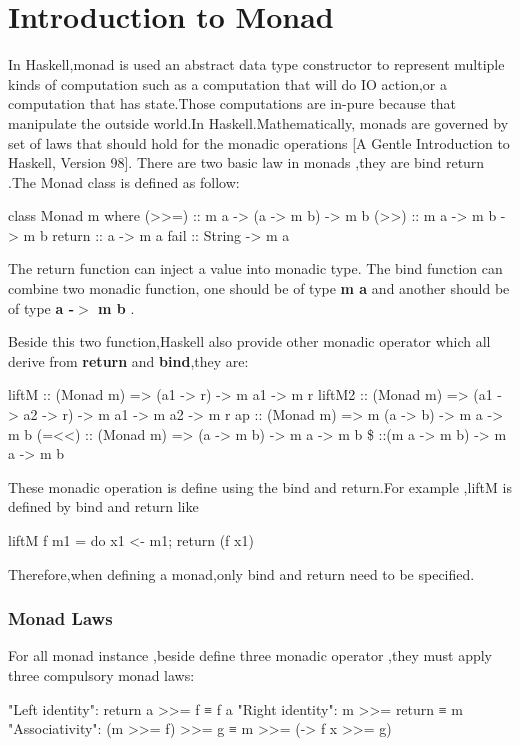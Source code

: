 \section{Introduction to Monad}
In Haskell,monad is used an abstract data type constructor to represent multiple kinds of computation such as a computation that will do IO action,or a computation that has state.Those computations are in-pure because that manipulate the outside world.In Haskell.Mathematically, monads are governed by set of laws that should hold for the monadic operations [A Gentle Introduction to Haskell, Version 98]. There are two basic law in monads ,they are bind return .The Monad class is defined as follow:
\begin{hcode}
class Monad m where
  (>>=) :: m a -> (a -> m b) -> m b
  (>>) :: m a -> m b -> m b
  return :: a -> m a
  fail :: String -> m a
\end{hcode}

The return function can inject a value into monadic type.
The bind function can combine two monadic function, one should be of type \textbf{m a} and another should be of type \textbf{a -$>$ m b} .

Beside this two function,Haskell also provide other monadic operator which all derive from \textbf{return} and \textbf{bind},they are:
\begin{hexample}
liftM :: (Monad m) => (a1 -> r) -> m a1 -> m r
liftM2  :: (Monad m) => (a1 -> a2 -> r) -> m a1 -> m a2 -> m r
ap :: (Monad m) => m (a -> b) -> m a -> m b
(=<<) :: (Monad m) => (a -> m b) -> m a -> m b
\$ ::(m a -> m b) -> m a -> m b 
\end{hexample}

These monadic operation is define using the bind and return.For example ,liftM is defined by bind and return like 
\begin{hcode}
liftM f m1              = do { x1 <- m1; return (f x1) }
\end{hcode}
Therefore,when defining a monad,only bind and return need to be specified.

\subsubsection{Monad Laws}
For all monad instance ,beside define three monadic operator ,they must apply three compulsory monad laws:
\begin{hcode}
"Left identity": return a >>= f  ≡  f a
"Right identity": m >>= return  ≡  m
"Associativity": (m >>= f) >>= g  ≡  m >>= (\x -> f x >>= g)
\end{hcode}

